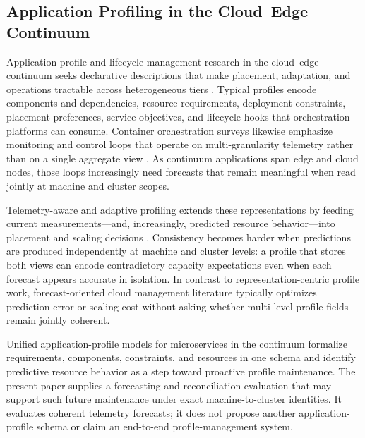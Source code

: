 \documentclass[a4paper,fleqn]{cas-dc}
\begin{document}
\subsection{Application Profiling in the Cloud--Edge Continuum}
Application-profile and lifecycle-management research in the cloud--edge
continuum seeks declarative descriptions that make placement, adaptation, and
operations tractable across heterogeneous tiers
\cite{duc2020survey,taherizadeh2018monitoring,buyya2019manifesto}.
Typical profiles encode components and dependencies, resource requirements,
deployment constraints, placement preferences, service objectives, and lifecycle
hooks that orchestration platforms can consume.
Container orchestration surveys likewise emphasize monitoring and control loops
that operate on multi-granularity telemetry rather than on a single aggregate
view
\cite{casalicchio2019container,rossi2020geo,toka2021kubernetes}.
As continuum applications span edge and cloud nodes, those loops increasingly
need forecasts that remain meaningful when read jointly at machine and cluster
scopes.

Telemetry-aware and adaptive profiling extends these representations by feeding
current measurements---and, increasingly, predicted resource behavior---into
placement and scaling decisions
\cite{taherizadeh2018monitoring,duc2020survey}.
Consistency becomes harder when predictions are produced independently at
machine and cluster levels: a profile that stores both views can encode
contradictory capacity expectations even when each forecast appears accurate in
isolation.
In contrast to representation-centric profile work, forecast-oriented cloud
management literature typically optimizes prediction error or scaling cost
without asking whether multi-level profile fields remain jointly coherent.

Unified application-profile models for microservices in the continuum
formalize requirements, components, constraints, and resources in one schema
and identify predictive resource behavior as a step toward proactive profile
maintenance.
The present paper supplies a forecasting and reconciliation evaluation that may
support such future maintenance under exact machine-to-cluster identities.
It evaluates coherent telemetry forecasts; it does not propose another
application-profile schema or claim an end-to-end profile-management system.
\end{document}
